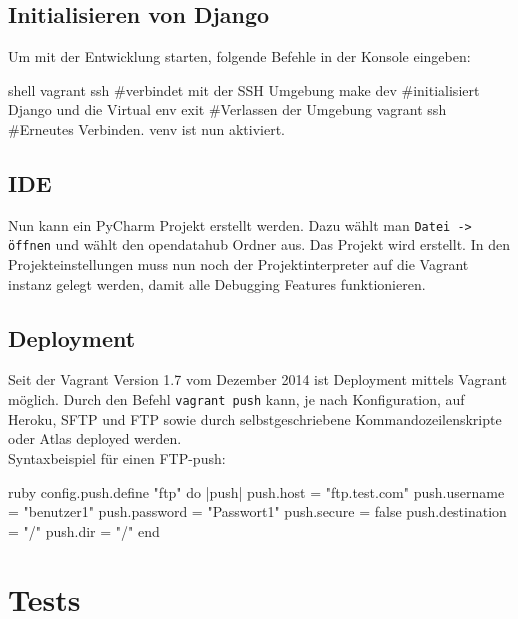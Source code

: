 \subsection{Initialisieren von Django}
Um mit der Entwicklung starten, folgende Befehle in der Konsole eingeben:
\begin{src}{shell}
vagrant ssh #verbindet mit der SSH Umgebung
make dev #initialisiert Django und die Virtual env
exit #Verlassen der Umgebung
vagrant ssh #Erneutes Verbinden. venv ist nun aktiviert.
\end{src}
\subsection{IDE}
Nun kann ein PyCharm Projekt erstellt werden. Dazu wählt man \texttt{Datei -> öffnen} und wählt den opendatahub Ordner aus. Das Projekt wird erstellt. In den Projekteinstellungen muss nun noch der Projektinterpreter auf die Vagrant instanz gelegt werden, damit alle Debugging Features funktionieren.
\subsection{Deployment}
Seit der Vagrant Version 1.7 vom Dezember 2014 ist Deployment mittels Vagrant möglich. Durch den Befehl \texttt{vagrant push} kann, je nach Konfiguration, auf Heroku, SFTP und FTP sowie durch selbstgeschriebene Kommandozeilenskripte oder Atlas deployed werden.
\\Syntaxbeispiel für einen FTP-push: \cite{vagrant-deployment}
\begin{src}{ruby}
config.push.define "ftp" do |push|
  push.host = "ftp.test.com"
  push.username = "benutzer1"
  push.password = "Passwort1"
  push.secure = false
  push.destination = "/"
  push.dir = "/"
end
\end{src}
\section{Tests}